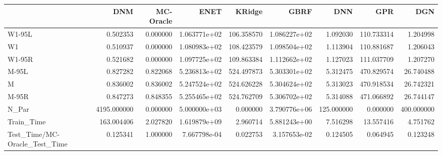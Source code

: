 \begin{tabular}{lrrrrrrrr}
\toprule
{} &          DNM &  MC-Oracle &          ENET &      KRidge &          GBRF &         DNN &         GPR &         DGN \\
\midrule
W1-95L                        &     0.502353 &   0.000000 &  1.063771e+02 &  106.358570 &  1.086227e+02 &    1.092030 &  110.733314 &    1.204998 \\
W1                            &     0.510937 &   0.000000 &  1.080983e+02 &  108.423579 &  1.098504e+02 &    1.113904 &  110.881687 &    1.206043 \\
W1-95R                        &     0.521682 &   0.000000 &  1.097725e+02 &  109.863384 &  1.112662e+02 &    1.127023 &  111.037709 &    1.207270 \\
M-95L                         &     0.827282 &   0.822068 &  5.236813e+02 &  524.497873 &  5.303301e+02 &    5.312475 &  470.829574 &   26.740488 \\
M                             &     0.836002 &   0.836002 &  5.247524e+02 &  524.626228 &  5.304624e+02 &    5.313023 &  470.918534 &   26.742321 \\
M-95R                         &     0.847273 &   0.848355 &  5.255465e+02 &  524.762709 &  5.306702e+02 &    5.314088 &  471.066892 &   26.744147 \\
N\_Par                         &  4195.000000 &   0.000000 &  5.000000e+03 &    0.000000 &  3.790776e+06 &  125.000000 &    0.000000 &  400.000000 \\
Train\_Time                    &   163.004406 &   2.027820 &  1.619879e+09 &    2.960714 &  5.881243e+00 &    7.516298 &   13.557416 &    4.751762 \\
Test\_Time/MC-Oracle\_Test\_Time &     0.125341 &   1.000000 &  7.667798e-04 &    0.022753 &  3.157653e-02 &    0.124505 &    0.064945 &    0.123248 \\
\bottomrule
\end{tabular}
